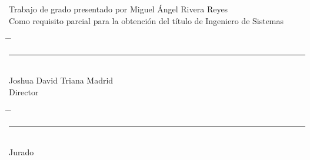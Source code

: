 \vspace*{4cm}
\begin{center}
Trabajo de grado presentado por Miguel Ángel Rivera Reyes\\
Como requisito parcial para la obtención del título de Ingeniero de Sistemas
\end{center}
\vfill
\vfill
\vfill
\begin{center}
\begin{tabbing}
\hspace{0.05\textwidth} \= \hspace{0.05\textwidth} \= \kill
\rule{70mm}{0.1mm} \\
Joshua David Triana Madrid\\
Director
\end{tabbing}
\end{center}
\vfill
\vfill
\vfill
\begin{center}
\begin{tabbing}
\hspace{0.05\textwidth} \= \hspace{0.05\textwidth} \= \kill
\rule{70mm}{0.1mm} \> \rightline{\rule{70mm}{0.1mm}} \\
Jurado \> 
\end{tabbing}
\end{center}
\vfill
\vfill
\vfill
\vfill
